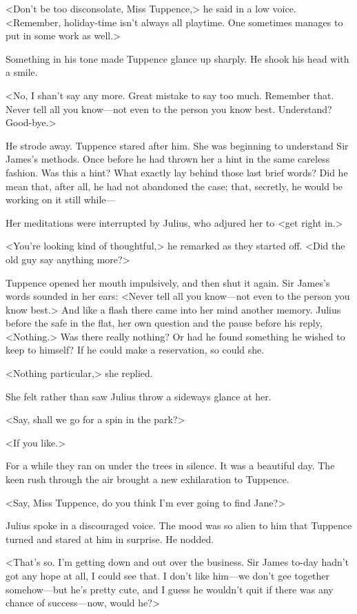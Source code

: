 <Don't be too disconsolate, Miss Tuppence,> he said in a low voice. <Remember, holiday-time isn't always all playtime. One sometimes manages to put in some work as well.>

Something in his tone made Tuppence glance up sharply. He shook his head with a smile.

<No, I shan't say any more. Great mistake to say too much. Remember that. Never tell all you know—not even to the person you know best. Understand? Good-bye.>

He strode away. Tuppence stared after him. She was beginning to understand Sir James's methods. Once before he had thrown her a hint in the same careless fashion. Was this a hint? What exactly lay behind those last brief words? Did he mean that, after all, he had not abandoned the case; that, secretly, he would be working on it still while—

Her meditations were interrupted by Julius, who adjured her to <get right in.>

<You're looking kind of thoughtful,> he remarked as they started off. <Did the old guy say anything more?>

Tuppence opened her mouth impulsively, and then shut it again. Sir James's words sounded in her ears: <Never tell all you know—not even to the person you know best.> And like a flash there came into her mind another memory. Julius before the safe in the flat, her own question and the pause before his reply, <Nothing.> Was there really nothing? Or had he found something he wished to keep to himself? If he could make a reservation, so could she.

<Nothing particular,> she replied.

She felt rather than saw Julius throw a sideways glance at her.

<Say, shall we go for a spin in the park?>

<If you like.>

For a while they ran on under the trees in silence. It was a beautiful day. The keen rush through the air brought a new exhilaration to Tuppence.

<Say, Miss Tuppence, do you think I'm ever going to find Jane?>

Julius spoke in a discouraged voice. The mood was so alien to him that Tuppence turned and stared at him in surprise. He nodded.

<That's so. I'm getting down and out over the business. Sir James to-day hadn't got any hope at all, I could see that. I don't like him—we don't gee together somehow—but he's pretty cute, and I guess he wouldn't quit if there was any chance of success—now, would he?>

